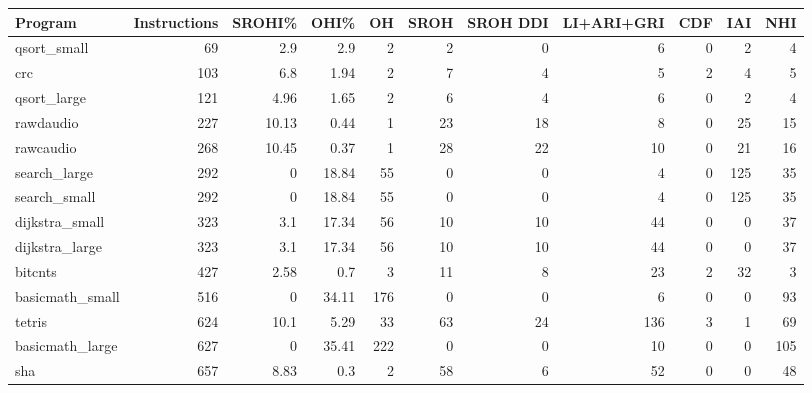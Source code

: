 \begin{tabular}{l|r|r|r|r|r|r|r|r|r|r}
\hline
 Program         &   Instructions &   SROHI\% &   OHI\% &   OH &   SROH &   SROH DDI &   LI+ARI+GRI &   CDF &   IAI &   NHI \\
\hline
 qsort\_small     &             69 &     2.9  &   2.9  &    2 &      2 &          0 &            6 &     0 &     2 &     4 \\
 \hline
 crc             &            103 &     6.8  &   1.94 &    2 &      7 &          4 &            5 &     2 &     4 &     5 \\
 \hline
 qsort\_large     &            121 &     4.96 &   1.65 &    2 &      6 &          4 &            6 &     0 &     2 &     4 \\
 \hline
 rawdaudio       &            227 &    10.13 &   0.44 &    1 &     23 &         18 &            8 &     0 &    25 &    15 \\
 \hline
 rawcaudio       &            268 &    10.45 &   0.37 &    1 &     28 &         22 &           10 &     0 &    21 &    16 \\
 \hline
 search\_large    &            292 &     0    &  18.84 &   55 &      0 &          0 &            4 &     0 &   125 &    35 \\
 \hline
 search\_small    &            292 &     0    &  18.84 &   55 &      0 &          0 &            4 &     0 &   125 &    35 \\
 \hline
 dijkstra\_small  &            323 &     3.1  &  17.34 &   56 &     10 &         10 &           44 &     0 &     0 &    37 \\
 \hline
 dijkstra\_large  &            323 &     3.1  &  17.34 &   56 &     10 &         10 &           44 &     0 &     0 &    37 \\
 \hline
 bitcnts         &            427 &     2.58 &   0.7  &    3 &     11 &          8 &           23 &     2 &    32 &     3 \\
 \hline
 basicmath\_small &            516 &     0    &  34.11 &  176 &      0 &          0 &            6 &     0 &     0 &    93 \\
 \hline
 tetris          &            624 &    10.1  &   5.29 &   33 &     63 &         24 &          136 &     3 &     1 &    69 \\
 \hline
 basicmath\_large &            627 &     0    &  35.41 &  222 &      0 &          0 &           10 &     0 &     0 &   105 \\
 \hline
 sha             &            657 &     8.83 &   0.3  &    2 &     58 &          6 &           52 &     0 &     0 &    48 \\

\end{tabular}
